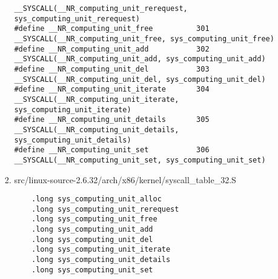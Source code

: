 \begin{enumerate}
\begin{itemize}
\begin{enumerate}
\begin{verbatim}
__SYSCALL(__NR_computing_unit_rerequest, sys_computing_unit_rerequest)
#define __NR_computing_unit_free          301
__SYSCALL(__NR_computing_unit_free, sys_computing_unit_free)
#define __NR_computing_unit_add           302
__SYSCALL(__NR_computing_unit_add, sys_computing_unit_add)
#define __NR_computing_unit_del           303
__SYSCALL(__NR_computing_unit_del, sys_computing_unit_del)
#define __NR_computing_unit_iterate       304
__SYSCALL(__NR_computing_unit_iterate, sys_computing_unit_iterate)
#define __NR_computing_unit_details       305
__SYSCALL(__NR_computing_unit_details, sys_computing_unit_details)
#define __NR_computing_unit_set           306
__SYSCALL(__NR_computing_unit_set, sys_computing_unit_set)
					\end{verbatim}
					\item src/linux-source-2.6.32/arch/x86/kernel/syscall\_table\_32.S
					\begin{verbatim}
	.long sys_computing_unit_alloc
	.long sys_computing_unit_rerequest
	.long sys_computing_unit_free
	.long sys_computing_unit_add
	.long sys_computing_unit_del
	.long sys_computing_unit_iterate
	.long sys_computing_unit_details
	.long sys_computing_unit_set
					\end{verbatim}
				\end{enumerate}
		\end{itemize}
	

\end{enumerate}
